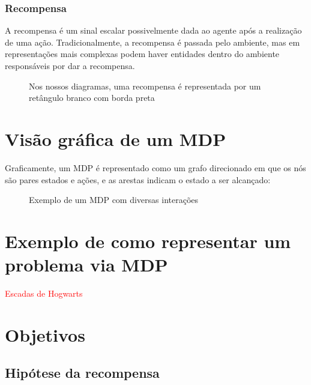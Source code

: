 \documentclass{article}
\begin{document}
            \subsubsection{Recompensa}
            
                A recompensa é um sinal escalar possivelmente dada ao agente após a realização de uma ação. Tradicionalmente, a recompensa é passada pelo ambiente, mas em representações mais complexas podem haver entidades dentro do ambiente responsáveis por dar a recompensa.
        
                \begin{figure}[ht]
                    \centering
                    \caption{Nos nossos diagramas, uma recompensa é representada por um retângulo branco com borda preta}
                    \label{diag:reward-label}
                \end{figure}
        
    \section{Visão gráfica de um MDP}
    
        Graficamente, um MDP é representado como um grafo direcionado em que os nós são pares estados e ações, e as arestas indicam o estado a ser alcançado:
    
        \begin{figure}[ht]
            \centering
            \mdpbig
            \caption{Exemplo de um MDP com diversas interações}
            \label{diag:mdp-big}
        \end{figure}
        
    \section{Exemplo de como representar um problema via MDP}
    
        \textcolor{red}{Escadas de Hogwarts}
    
    \section{Objetivos}
    
        \subsection{Hipótese da recompensa}
    
\end{document}
